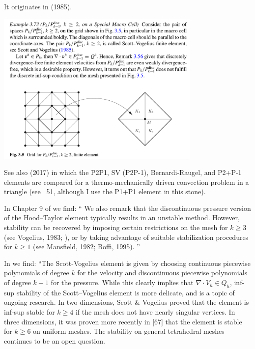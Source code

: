 
It originates in  (1985). 

\begin{center}
\includegraphics[width=10cm]{images/pair_scott_vogelius/john_scott_vogelius}\\
\end{center}

See also \textcite{jolm17} (2017) in which the P2P1, SV (P2P-1), Bernardi-Raugel, and P2+P-1 elements 
are compared for a thermo-mechanically driven convection problem in a triangle (see \stone~51, 
although I use the P1+P1 element in this stone).
 
In Chapter 9 of \textcite{bobm13} we find: 
``
We also remark that the discontinuous
pressure version of the Hood–Taylor element typically
results in an unstable method. However, stability can be
recovered by imposing certain restrictions on the mesh for
$k \ge 3$ (see Vogelius, 1983; \cite{scvo85}), or
by taking advantage of suitable stabilization procedures for
$k\ge 1$ (see Mansfield, 1982; Boffi, 1995).
''

In \textcite{fams21} we find:
``The Scott-Vogelius element is given by choosing continuous piecewise polynomials of degree $k$ for
the velocity and discontinuous piecewise polynomials of degree $k-1$ for the pressure. While this clearly
implies that $\nabla\cdot V_h \in Q_h$, inf-sup stability of the Scott–Vogelius element 
is more delicate, and is a topic of ongoing research. 
In two dimensions, Scott \& Vogelius proved \cite{scvo85} that the element is inf-sup
stable for $k\ge 4$ if the mesh does not have nearly singular vertices. 
In three dimensions, it was proven more recently in [67] that the element is stable 
for $k\ge 6$ on uniform meshes. The stability on general
tetrahedral meshes continues to be an open question.

